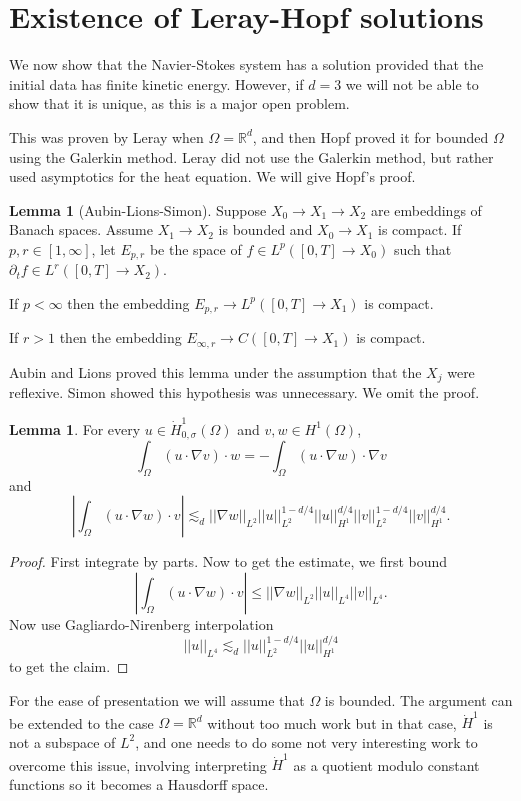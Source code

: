 \documentclass[12pt]{book}
\newcommand{\RR}{\mathbb{R}}
\theoremstyle{definition}
\newtheorem{lemma}[theorem]{Lemma}
\begin{document}
\section{Existence of Leray-Hopf solutions}
We now show that the Navier-Stokes system has a solution provided that the initial data has finite kinetic energy.
However, if $d = 3$ we will not be able to show that it is unique, as this is a major open problem.

This was proven by Leray when $\Omega = \RR^d$, and then Hopf proved it for bounded $\Omega$ using the Galerkin method.
Leray did not use the Galerkin method, but rather used asymptotics for the heat equation.
We will give Hopf's proof.

\begin{lemma}[Aubin-Lions-Simon]
Suppose $X_0 \to X_1 \to X_2$ are embeddings of Banach spaces.
Assume $X_1 \to X_2$ is bounded and $X_0 \to X_1$ is compact.
If $p, r \in [1, \infty]$, let $E_{p,r}$ be the space of $f \in L^p([0, T] \to X_0)$ such that $\partial_t f \in L^r([0, T] \to X_2)$.

If $p < \infty$ then the embedding $E_{p,r} \to L^p([0, T] \to X_1)$ is compact.

If $r > 1$ then the embedding $E_{\infty, r} \to C([0, T] \to X_1)$ is compact.
\end{lemma}

Aubin and Lions proved this lemma under the assumption that the $X_j$ were reflexive.
Simon showed this hypothesis was unnecessary.
We omit the proof.

\begin{lemma}
For every $u \in \dot H^1_{0,\sigma}(\Omega)$ and $v, w \in H^1(\Omega)$,
$$\int_\Omega (u \cdot \nabla v) \cdot w = -\int_\Omega (u \cdot \nabla w) \cdot \nabla v$$
and
$$\left|\int_\Omega (u \cdot \nabla w) \cdot v\right| \lesssim_d ||\nabla w||_{L^2} ||u||_{L^2}^{1-d/4} ||u||_{H^1}^{d/4} ||v||_{L^2}^{1 - d/4} ||v||^{d/4}_{H^1}.$$
\end{lemma}
\begin{proof}
First integrate by parts.
Now to get the estimate, we first bound
$$\left|\int_\Omega (u \cdot \nabla w) \cdot v\right| \leq ||\nabla w||_{L^2} ||u||_{L^4} ||v||_{L^4}.$$
Now use Gagliardo-Nirenberg interpolation
$$||u||_{L^4} \lesssim_d ||u||_{L^2}^{1-d/4}||u||_{H^1}^{d/4}$$
to get the claim.
\end{proof}

For the ease of presentation we will assume that $\Omega$ is bounded.
The argument can be extended to the case $\Omega = \RR^d$ without too much work but in that case, $\dot H^1$ is not a subspace of $L^2$, and one needs to do some not very interesting work to overcome this issue, involving interpreting $\dot H^1$ as a quotient modulo constant functions so it becomes a Hausdorff space.
\end{document}
